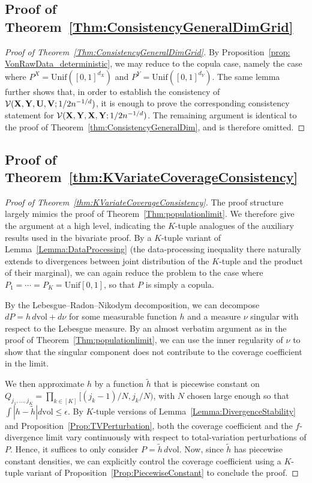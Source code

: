 \documentclass[11pt]{article}
\begin{document}
\subsection{Proof of Theorem~\ref{Thm:ConsistencyGeneralDimGrid}}


\begin{proof}[Proof of Theorem~\ref{Thm:ConsistencyGeneralDimGrid}]  
By Proposition~\ref{prop: VonRawData_deterministic}, we may reduce to the copula case, namely the case where $P^X = \mathrm{Unif}([0,1]^{d_X})$ and $P^Y = \mathrm{Unif}([0,1]^{d_Y})$. The same lemma further shows that, in order to establish the consistency of $\mathcal{V}({\bf X}, {\bf Y}, {\bf U}, {\bf V}; 1/2 n^{-1/d})$, it is enough to prove the corresponding consistency statement for $\mathcal{V}({\bf X}, {\bf Y}, {\bf X}, {\bf Y}; 1/2 n^{-1/d})$. The remaining argument is identical to the proof of Theorem~\ref{thm:ConsistencyGeneralDim}, and is therefore omitted.
\end{proof}  



\subsection{Proof of Theorem~\ref{thm:KVariateCoverageConsistency}}

\begin{proof}[Proof of Theorem~\ref{thm:KVariateCoverageConsistency}]   
The proof structure largely mimics the proof of Theorem~\ref{Thm:populationlimit}. We therefore give the argument at a high level, indicating the $K$-tuple analogues of the auxiliary results used in the bivariate proof. By a $K$-tuple variant of Lemma~\ref{Lemma:DataProcessing} (the data-processing inequality there naturally extends to divergences between joint distribution of the $K$-tuple and the product of their marginal), we can again reduce the problem to the case where $P_1=\cdots=P_K = \mathrm{Unif}[0,1]$, so that $P$ is simply a copula. 

By the Lebesgue--Radon--Nikodym decomposition, we can decompose $dP = h\,d\mathrm{vol} + d\nu$ for some measurable function $h$ and a measure $\nu$ singular with respect to the Lebesgue measure. By an almost verbatim argument as in the proof of Theorem~\ref{Thm:populationlimit}, we can use the inner regularity of $\nu$ to show that the singular component does not contribute to the coverage coefficient in the limit. 

We then approximate $h$ by a function $\tilde h$ that is piecewise constant on $Q_{j_1,\ldots,j_K} = \prod_{k\in[K]} [(j_k-1)/N, j_k/N)$, with $N$ chosen large enough so that $\int |h - \tilde h| d\mathrm{vol} \leq \epsilon$. By $K$-tuple versions of Lemma~\ref{Lemma:DivergenceStability} and Proposition~\ref{Prop:TVPerturbation}, both the coverage coefficient and the $f$-divergence limit vary continuously with respect to total-variation perturbations of $P$. Hence, it suffices to only consider $P = \tilde h \,d\mathrm{vol}$. Now, since $\tilde h$ has piecewise constant densities, we can explicitly control the coverage coefficient using a $K$-tuple variant of Proposition~\ref{Prop:PiecewiseConstant} to conclude the proof. 
\end{proof}
\end{document}
